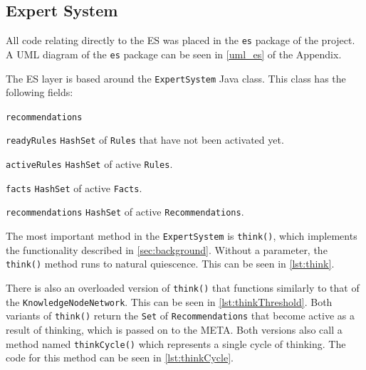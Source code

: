 \documentclass[titlepage,11pt]{article}
\def \espath {"/Users/seanstappas1/GitHub/prometheus-ai/src/main/java/es/api/ExpertSystem.java"}
\newcommand{\ar}[1]{\autoref{#1}}
\newcommand{\code}[1]{\texttt{#1}}
\begin{document}
\subsection{Expert System}

All code relating directly to the ES was placed in the \code{es} package of the project. A UML diagram of the \code{es} package can be seen in \autoref{uml_es} of the Appendix.

The ES layer is based around the \code{ExpertSystem} Java class. This class has the following fields:

\begin{labeling}{\code{recommendations}}
	\item[\code{readyRules}] \code{HashSet} of \code{Rules} that have not been activated yet.
	\item[\code{activeRules}] \code{HashSet} of active \code{Rules}.
	\item[\code{facts}] \code{HashSet} of active \code{Facts}.
	\item[\code{recommendations}] \code{HashSet} of active \code{Recommendations}.
\end{labeling}

The most important method in the \code{ExpertSystem} is \code{think()}, which implements the functionality described in \ar{sec:background}. Without a parameter, the \code{think()} method runs to natural quiescence. This can be seen in \autoref{lst:think}.





There is also an overloaded version of \code{think()} that functions similarly to that of the \code{KnowledgeNodeNetwork}. This can be seen in \autoref{lst:thinkThreshold}. Both variants of \code{think()} return the \code{Set} of \code{Recommendations} that become active as a result of thinking, which is passed on to the META. Both versions also call a method named \code{thinkCycle()} which represents a single cycle of thinking. The code for this method can be seen in \autoref{lst:thinkCycle}.


\end{document}
